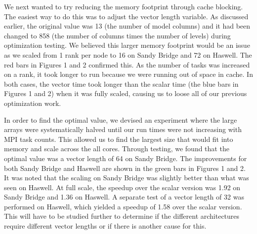 
We next wanted to try reducing the memory footprint through cache blocking.  The easiest way to do this was to adjust the vector length variable.  As discussed earlier, the original value was 13 (the number of model columns) and it had been changed to 858 (the number of columns times the number of levels) during optimization testing.  We believed this larger memory footprint would be an issue as we scaled from 1 rank per node to 16 on Sandy Bridge and 72 on Haswell.  The red bars in Figures 1 and 2 confirmed this.  As the number of tasks was increased on a rank, it took longer to run because we were running out of space in cache.  In both cases, the vector time took longer than the scalar time (the blue bars in Figures 1 and 2) when it was fully scaled, causing us to loose all of our previous optimization work.  



In order to find the optimal value, we devised an experiment where the large arrays were systematically halved until our run times were not increasing with MPI task counts.  This allowed us to find the largest size that would fit into memory and scale across the all cores.  Through testing, we found that the optimal value was a vector length of 64 on Sandy Bridge.  The improvements for both Sandy Bridge and Haswell are shown in the green bars in Figures 1 and 2.  It was noted that the scaling on Sandy Bridge was slightly better than what was seen on Haswell.  At full scale, the speedup over the scalar version was 1.92 on Sandy Bridge and 1.36 on Haswell.  A separate test of a vector length of 32 was performed on Haswell, which yielded a speedup of 1.58 over the scalar version.  This will have to be studied further to determine if the different architectures require different vector lengths or if there is another cause for this.

